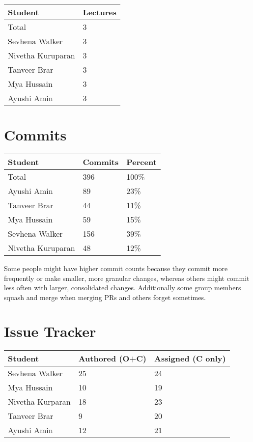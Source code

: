 \documentclass{article}
\begin{document}
\begin{table}[H]
\centering
\begin{tabular}{ll}
\toprule
\textbf{Student} & \textbf{Lectures}\\
\midrule
Total & 3\\
Sevhena Walker & 3\\
Nivetha Kuruparan & 3\\
Tanveer Brar & 3\\
Mya Hussain & 3\\
Ayushi Amin & 3\\
\bottomrule
\end{tabular}
\end{table}

\section{Commits}

\begin{table}[H]
\centering
\begin{tabular}{lll}
\toprule
\textbf{Student} & \textbf{Commits} & \textbf{Percent}\\
\midrule
Total & 396 & 100\% \\
Ayushi Amin & 89 & 23\% \\
Tanveer Brar & 44 & 11\% \\
Mya Hussain & 59 & 15\% \\
Sevhena Walker & 156 & 39\% \\
Nivetha Kuruparan & 48 & 12\% \\
\bottomrule
\end{tabular}
\end{table}

Some people might have higher commit counts because they commit more frequently or make smaller, more granular changes, whereas others might commit less often with larger, consolidated changes. Additionally some group members squash and merge when merging PRs and others forget sometimes.

\section{Issue Tracker}


\begin{table}[H]
\centering
\begin{tabular}{lll}
\toprule
\textbf{Student} & \textbf{Authored (O+C)} & \textbf{Assigned (C only)}\\
\midrule
Sevhena Walker & 25 & 24 \\
Mya Hussain & 10 & 19 \\
Nivetha Kurparan & 18 & 23 \\
Tanveer Brar & 9 & 20 \\
Ayushi Amin & 12 & 21 \\
\bottomrule
\end{tabular}
\end{table}
\end{document}
